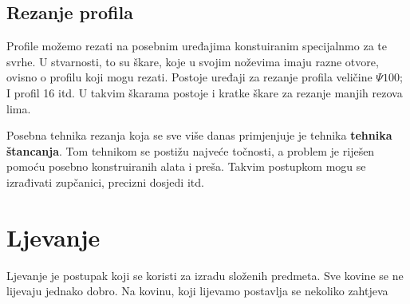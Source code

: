 \documentclass[a4paper,12pt]{article}
\numberwithin{figure}{section}
\begin{document}
\subsection{Rezanje profila}
Profile možemo rezati na posebnim uređajima konstuiranim specijalnmo za te svrhe. U stvarnosti, to su škare, koje u svojim noževima imaju razne otvore, ovisno o profilu koji mogu rezati. Postoje uređaji za rezanje profila veličine $\Psi 100$; I profil 16 itd. U takvim škarama postoje i kratke škare za rezanje manjih rezova lima.\par
Posebna tehnika rezanja koja se sve više danas primjenjuje je tehnika \textbf{tehnika štancanja}. Tom tehnikom se postižu najveće točnosti, a problem je riješen pomoću posebno konstruiranih alata i preša. Takvim postupkom mogu se izrađivati zupčanici, precizni dosjedi itd.
\section{Ljevanje}
Ljevanje je postupak koji se koristi za izradu složenih predmeta. Sve kovine se ne lijevaju jednako dobro. Na kovinu, koji lijevamo postavlja se nekoliko zahtjeva
\end{document}

